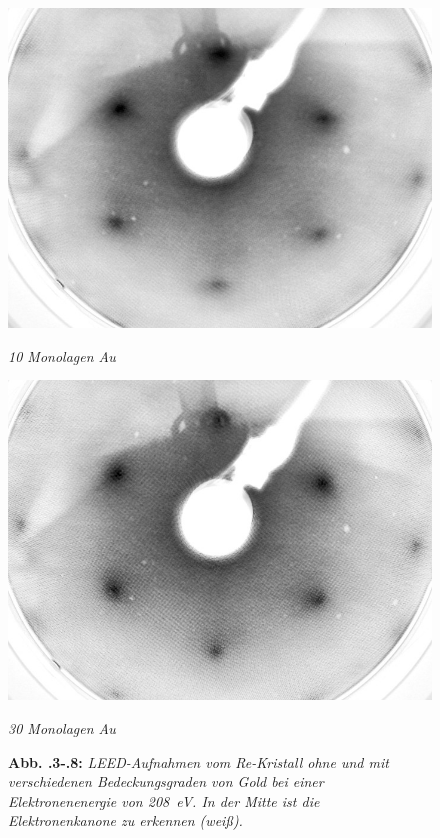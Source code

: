 \begin{figure}[H]
	\begin{minipage}[b]{0.5\textwidth} 
		\includegraphics[width=\textwidth]{LEED-Bilder/bearbeitet/10ML_E207}
		\caption{\textit{10 Monolagen Au}}
		\label{10ML} 
	\end{minipage}
	\hfill
	\begin{minipage}[b]{0.5\textwidth}
		\includegraphics[width=\textwidth]{LEED-Bilder/bearbeitet/30ML_E208}
		\caption{\textit{30 Monolagen Au}}
		\label{30ML} 
	\end{minipage}
	\caption*{\textbf{Abb. \thechapter.3-\thechapter.8:} \textit{LEED-Aufnahmen vom Re-Kristall ohne
	und mit verschiedenen Bedeckungsgraden von Gold bei einer Elektronenenergie von \SI{208}{eV}. In
	der Mitte ist die Elektronenkanone zu erkennen (weiß).}}
\end{figure}


